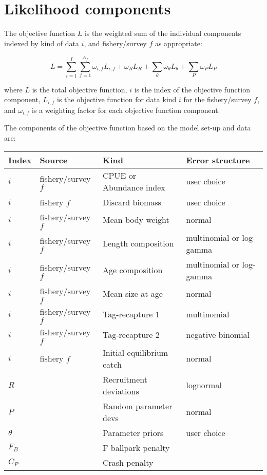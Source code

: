 \section{Likelihood components}

The objective function $L$ is the weighted sum of the individual components indexed by kind of data $i$, and fishery/survey $f$ as appropriate:

\begin{equation}
	L = \sum_{i=1}^{I}\sum_{f=1}^{A_f}\omega_{i,f} L_{i,f}+\omega_R L_R + \sum_{\theta}^{}\omega_\theta L_\theta + \sum_{P}^{}\omega_P L_P
\end{equation}

where $L$ is the total objective function, $i$ is the index of the objective function component, $L_{i,f}$ is the objective function for data kind $i$ for the fishery/survey $f$, and $\omega_{i,f}$ is a weighting factor for each objective function component.

The components of the objective function based on the model set-up and data are: 

\begin{longtable}{p{1cm} p{3.5cm} p{5.5cm} p{4.75cm}}
	\hline
	Index & Source & Kind & Error structure\Tstrut\Bstrut\\
	\hline	
	$i$ & fishery/survey $f$ & CPUE or Abundance index & user choice \Tstrut\\
	$i$ & fishery $f$        & Discard biomass         & user choice \Tstrut\\
	$i$ & fishery/survey $f$ & Mean body weight        & normal \Tstrut\\
	$i$ & fishery/survey $f$ & Length composition      & multinomial or log-gamma\Tstrut\\
	$i$ & fishery/survey $f$ & Age composition         & multinomial or log-gamma\Tstrut\\
	$i$ & fishery/survey $f$ & Mean size-at-age        & normal \Tstrut\\
	$i$ & fishery/survey $f$ & Tag-recapture 1         & multinomial \Tstrut\\
	$i$ & fishery/survey $f$ & Tag-recapture 2         & negative binomial\Tstrut\\
	$i$ & fishery $f$        & Initial equilibrium catch & normal \Tstrut\\
	$R$ & 					 & Recruitment deviations  & lognormal \Tstrut\\
	$P$ & 					 & Random parameter devs   & normal \Tstrut\\
	$\theta$ & 				 & Parameter priors	       & user choice\Tstrut\\
	$F_B$ & 				 & F ballpark penalty	   &  \Tstrut\\
	$C_P$ &				     & Crash penalty           &  \Tstrut\Bstrut\\
	\hline
\end{longtable}

